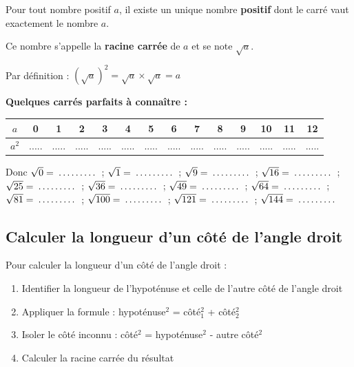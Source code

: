 \begin{proprietebox}
Pour tout nombre positif $a$, il existe un unique nombre \textbf{positif} dont le carré vaut exactement le nombre $a$.

Ce nombre s'appelle la \textbf{racine carrée} de $a$ et se note $\sqrt{a}$.

Par définition : $(\sqrt{a})^2 = \sqrt{a} \times \sqrt{a} = a$
\end{proprietebox}

\begin{examplebox}
\textbf{Quelques carrés parfaits à connaître :}

\begin{center}
\begin{tabular}{|c|c|c|c|c|c|c|c|c|c|c|c|c|c|}
\hline
$a$ & 0 & 1 & 2 & 3 & 4 & 5 & 6 & 7 & 8 & 9 & 10 & 11 & 12 \\
\hline
$a^2$ & ..... & ..... & ..... & ..... & ..... & ..... & ..... & ..... & ..... & ..... & ..... & ..... & ..... \\
\hline
\end{tabular}
\end{center}

Donc $\sqrt{0} = \trous{1.5cm}$ ; $\sqrt{1} = \trous{1.5cm}$ ; $\sqrt{9} = \trous{1.5cm}$ ; $\sqrt{16} = \trous{1.5cm}$ ; $\sqrt{25} = \trous{1.5cm}$ ; $\sqrt{36} = \trous{1.5cm}$ ; $\sqrt{49} = \trous{1.5cm}$ ; $\sqrt{64} = \trous{1.5cm}$ ;\\ $\sqrt{81} = \trous{1.5cm}$ ; $\sqrt{100} = \trous{1.5cm}$ ; $\sqrt{121} = \trous{1.5cm}$ ; $\sqrt{144} = \trous{1.5cm}$
\end{examplebox}


\subsection{Calculer la longueur d'un côté de l'angle droit}
\begin{methodebox}
Pour calculer la longueur d'un côté de l'angle droit :
\begin{enumerate}
    \item Identifier la longueur de l'hypoténuse et celle de l'autre côté de l'angle droit
    \item Appliquer la formule : hypoténuse$^2$ = côté$_1^2$ + côté$_2^2$
    \item Isoler le côté inconnu : côté$^2$ = hypoténuse$^2$ - autre côté$^2$
    \item Calculer la racine carrée du résultat
\end{enumerate}
\end{methodebox}


